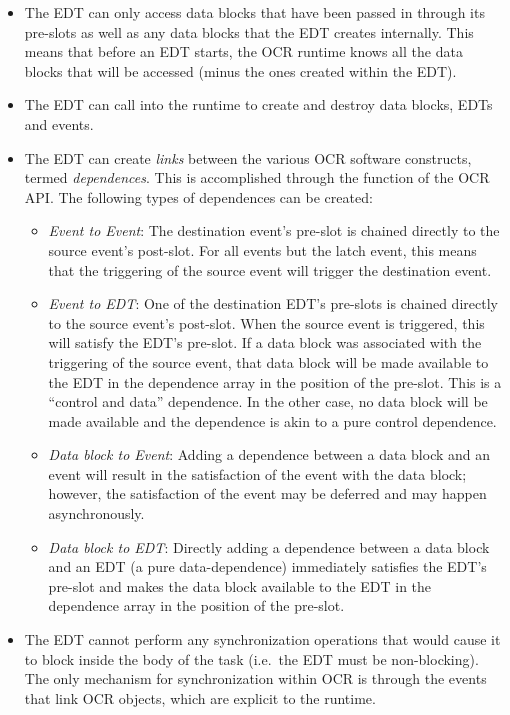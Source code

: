 \begin{itemize}
\item The EDT can only access data blocks that have been passed in
through its pre-slots as well as any data blocks that the EDT creates
internally. This means that before an EDT starts, the OCR runtime
knows all the data blocks that will be accessed (minus the ones
created within the EDT).

\item The EDT can call into the runtime to create and destroy data
blocks, EDTs and events.

\item The EDT can create \emph{links} between the various OCR
software constructs, termed \emph{dependences}. This is
accomplished through the  function of the OCR
API. The following types of dependences can be created:
\begin{itemize}
\item \emph{Event to Event}: The destination event’s pre-slot is chained
directly to the source event’s post-slot.
For all events but the latch event, this means that the triggering of
the source event will trigger the destination event.

\item \emph{Event to EDT}: One of the destination EDT’s pre-slots is chained
directly to the source event’s post-slot. When the source event is
triggered, this will satisfy the EDT’s pre-slot. If a data block was
associated with the triggering of the source event, that data block
will be made available to the EDT in the dependence array in the
position of the pre-slot. This is a ``control and data'' dependence. In
the other case, no data block will be made available and the
dependence is akin to a pure control dependence.

\item \emph{Data block to Event}: Adding a dependence between a data block and an
event will result in the satisfaction of the event with the data block;
however, the satisfaction of the event may be deferred and may happen asynchronously.

\item \emph{Data block to EDT}: Directly adding a dependence between a data block and
an EDT (a pure data-dependence) immediately satisfies the EDT’s
pre-slot and makes the data block available to the EDT in the
dependence array in the position of the pre-slot.
\end{itemize}

\item The EDT cannot perform any synchronization operations that would
cause it to block inside the body of the task (i.e.\ the EDT must be
non-blocking). The only mechanism for synchronization within OCR is
through the events that link OCR objects, which are explicit to the
runtime.
\end{itemize}

